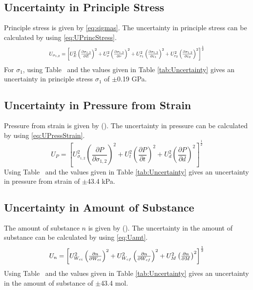 \documentclass[10pt,journal,letterpaper]{IEEEtran}
\begin{document}
\subsection*{Uncertainty in Principle Stress}

Principle stress is given by \eqref{eq:sigmas}.
The uncertainty in principle stress can be calculated by using \eqref{eq:UPrincStress}.
\begin{equation}
\label{eq:UPrincStress}
\resizebox{227pt}{!}{$U_{\sigma_{1,2}}=\left[U_{E}^2 \left(\frac{\partial \sigma_{1,2}}{\partial E}\right)^2 + U_{\nu}^2 \left(\frac{\partial \sigma_{1,2}}{\partial \nu}\right)^2 + U_{\varepsilon_1}^2 \left(\frac{\partial \sigma_{1,2}}{\partial \varepsilon_1}\right)^2 + U_{\varepsilon_2}^2 \left(\frac{\partial \sigma_{1,2}}{\partial \varepsilon_2}\right)^2 \right]^{\frac{1}{2}}$}
\end{equation}
For $\sigma_1$, using Table \todo\ and the values given in Table \ref{tab:Uncertainty} gives an uncertainty in principle stress $\sigma_1$ of $\pm$0.19 GPa.

\subsection*{Uncertainty in Pressure from Strain}

Pressure from strain is given by (\todo).
The uncertainty in pressure can be calculated by using \eqref{eq:UPressStrain}.
\begin{equation}
\label{eq:UPressStrain}
U_{P}=\left[U_{\sigma_{1,2}}^2 \left(\frac{\partial P}{\partial \sigma_{1,2}}\right)^2 + U_{t}^2 \left(\frac{\partial P}{\partial t}\right)^2 + U_{d}^2 \left(\frac{\partial P}{\partial d}\right)^2 \right]^{\frac{1}{2}}
\end{equation}
Using Table \todo\ and the values given in Table \ref{tab:Uncertainty} gives an uncertainty in pressure from strain of $\pm$43.4 kPa.

\subsection*{Uncertainty in Amount of Substance}

The amount of substance $n$ is given by (\todo).
The uncertainty in the amount of substance can be calculated by using \eqref{eq:Uamt}.
\begin{equation}
\label{eq:Uamt}
\resizebox{227pt}{!}{$U_{n}=\left[U_{W_{ci}}^2 \left(\frac{\partial n}{\partial W_{ci}}\right)^2 + U_{W_{cf}}^2 \left(\frac{\partial n}{\partial W_{cf}}\right)^2 + U_{M}^2 \left(\frac{\partial n}{\partial M}\right)^2 \right]^{\frac{1}{2}}$}
\end{equation}
Using Table \todo\ and the values given in Table \ref{tab:Uncertainty} gives an uncertainty in the amount of substance of $\pm$43.4 mol.
\end{document}
